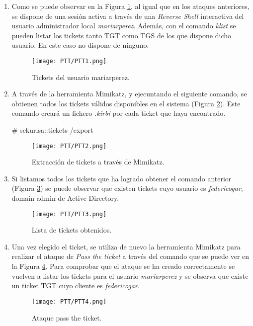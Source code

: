 \begin{enumerate}

\item Como se puede observar en la Figura \ref{PTT1}, al igual que en los ataques anteriores, se dispone de una sesión activa a través de una {\it Reverse Shell} interactiva del usuario administrador local {\it mariarperez}. Además, con el comando {\it klist} se pueden listar los tickets tanto TGT como TGS de los que dispone dicho usuario. En este caso no dispone de ninguno.
\begin{figure}[H] %
\begin{center}
\texttt{[image: PTT/PTT1.png]}
\end{center}
\caption{Tickets del usuario mariarperez.}
\label{PTT1}
\end{figure}

\item A través de la herramienta Mimikatz, y ejecuntando el siguiente comando, se obtienen todos los tickets válidos disponibles en el sistema (Figura \ref{PTT2}). Este comando creará un fichero {\it *.kirbi} por cada ticket que haya encontrado. 
\begin{listing}[style=consola, numbers=none]
# sekurlsa::tickets /export
\end{listing}
\begin{figure}[H] %
\begin{center}
\texttt{[image: PTT/PTT2.png]}
\end{center}
\caption{Extracción de tickets a través de Mimikatz.}
\label{PTT2}
\end{figure}

\item Si listamos todos los tickets que ha logrado obtener el comando anterior (Figura \ref{PTT3}) se puede observar que existen tickets cuyo usuario es {\it federicogar}, domain admin de Active Directory. 
\begin{figure}[H] %
\begin{center}
\texttt{[image: PTT/PTT3.png]}
\end{center}
\caption{Lista de tickets obtenidos.}
\label{PTT3}
\end{figure}

\item Una vez elegido el ticket, se utiliza de nuevo la herramienta Mimikatz para realizar el ataque de {\it Pass the ticket} a través del comando que se puede ver en la Figura \ref{PTT4}. Para comprobar que el ataque se ha creado correctamente se vuelven a listar los tickets para el usuario {\it mariarperez} y se observa que existe un ticket TGT cuyo cliente es {\it federicogar}.
\begin{figure}[H] %
\begin{center}
\texttt{[image: PTT/PTT4.png]}
\end{center}
\caption{Ataque pass the ticket.}
\label{PTT4}
\end{figure}


\end{enumerate}
